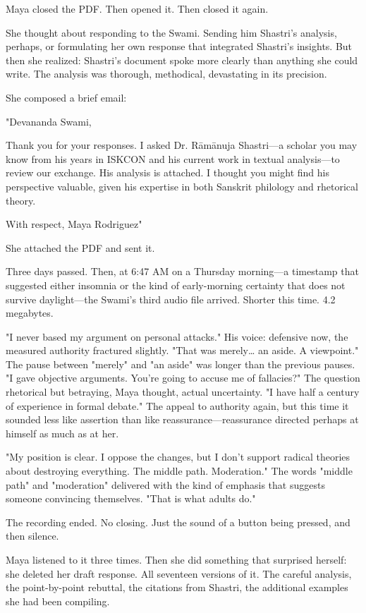 \documentclass[12pt,twoside]{book}
\begin{document}
Maya closed the PDF. Then opened it. Then closed it again.

She thought about responding to the Swami. Sending him Shastri's analysis, perhaps, or formulating her own response that integrated Shastri's insights. But then she realized: Shastri's document spoke more clearly than anything she could write. The analysis was thorough, methodical, devastating in its precision.

She composed a brief email:

"Devananda Swami,

Thank you for your responses. I asked Dr. Rāmānuja Shastri—a scholar you may know from his years in ISKCON and his current work in textual analysis—to review our exchange. His analysis is attached. I thought you might find his perspective valuable, given his expertise in both Sanskrit philology and rhetorical theory.

With respect, Maya Rodriguez"

She attached the PDF and sent it.

Three days passed. Then, at 6:47 AM on a Thursday morning—a timestamp that suggested either insomnia or the kind of early-morning certainty that does not survive daylight—the Swami's third audio file arrived. Shorter this time. 4.2 megabytes.

"I never based my argument on personal attacks." His voice: defensive now, the measured authority fractured slightly. "That was merely\ldots{} an aside. A viewpoint." The pause between "merely" and "an aside" was longer than the previous pauses. "I gave objective arguments. You're going to accuse me of fallacies?" The question rhetorical but betraying, Maya thought, actual uncertainty. "I have half a century of experience in formal debate." The appeal to authority again, but this time it sounded less like assertion than like reassurance—reassurance directed perhaps at himself as much as at her.

"My position is clear. I oppose the changes, but I don't support radical theories about destroying everything. The middle path. Moderation." The words "middle path" and "moderation" delivered with the kind of emphasis that suggests someone convincing themselves. "That is what adults do."

The recording ended. No closing. Just the sound of a button being pressed, and then silence.

Maya listened to it three times. Then she did something that surprised herself: she deleted her draft response. All seventeen versions of it. The careful analysis, the point-by-point rebuttal, the citations from Shastri, the additional examples she had been compiling.
\end{document}
